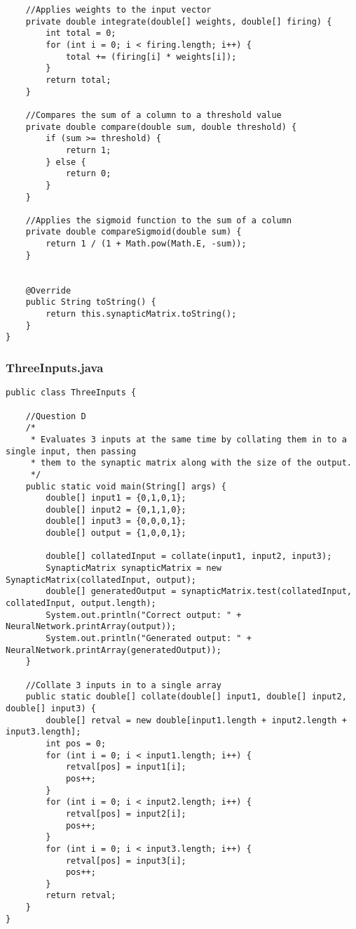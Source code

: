 \documentclass{article}
\begin{document}
\begin{lstlisting}
	//Applies weights to the input vector
	private double integrate(double[] weights, double[] firing) {
		int total = 0;
		for (int i = 0; i < firing.length; i++) {
			total += (firing[i] * weights[i]);
		}
		return total;
	}
	
	//Compares the sum of a column to a threshold value
	private double compare(double sum, double threshold) {
		if (sum >= threshold) {
			return 1;
		} else {
			return 0;
		}
	}
	
	//Applies the sigmoid function to the sum of a column
	private double compareSigmoid(double sum) {
		return 1 / (1 + Math.pow(Math.E, -sum));
	}
	
	
	@Override
	public String toString() {
		return this.synapticMatrix.toString();
	}
}
\end{lstlisting}

\subsubsection*{ThreeInputs.java}
\begin{lstlisting}
public class ThreeInputs {

	//Question D
	/*
	 * Evaluates 3 inputs at the same time by collating them in to a single input, then passing
	 * them to the synaptic matrix along with the size of the output.
	 */
	public static void main(String[] args) {
		double[] input1 = {0,1,0,1};
		double[] input2 = {0,1,1,0};
		double[] input3 = {0,0,0,1};
		double[] output = {1,0,0,1};
		
		double[] collatedInput = collate(input1, input2, input3);
		SynapticMatrix synapticMatrix = new SynapticMatrix(collatedInput, output);
		double[] generatedOutput = synapticMatrix.test(collatedInput, collatedInput, output.length);
		System.out.println("Correct output: " + NeuralNetwork.printArray(output));
		System.out.println("Generated output: " + NeuralNetwork.printArray(generatedOutput));
	}

	//Collate 3 inputs in to a single array
	public static double[] collate(double[] input1, double[] input2, double[] input3) {
		double[] retval = new double[input1.length + input2.length + input3.length];
		int pos = 0;
		for (int i = 0; i < input1.length; i++) {
			retval[pos] = input1[i];
			pos++;
		}
		for (int i = 0; i < input2.length; i++) {
			retval[pos] = input2[i];
			pos++;
		}
		for (int i = 0; i < input3.length; i++) {
			retval[pos] = input3[i];
			pos++;
		}
		return retval;
	}
}
\end{lstlisting}
\end{document}
